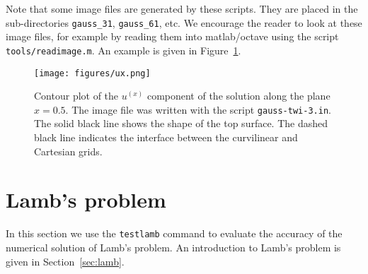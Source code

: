 \documentclass[11pt]{report}
\begin{document}
Note that some image files are generated by these scripts. They are placed in the sub-directories
\verb+gauss_31+, \verb+gauss_61+, etc. We encourage the reader to look at these image files, for
example by reading them into matlab/octave using the script \verb+tools/readimage.m+. An example is
given in Figure~\ref{fig:ux}.
\begin{figure}
\begin{center}
\texttt{[image: figures/ux.png]}
\caption{Contour plot of the $u^{(x)}$ component of the solution along the plane $x=0.5$. The image
  file was written with the script {\tt gauss-twi-3.in}. The solid black line shows the shape of the
  top surface. The dashed black line indicates the interface between the curvilinear and Cartesian
  grids.}
\label{fig:ux}
\end{center}
\end{figure}


\section{Lamb's problem}\label{sec:testlamb}

In this section we use the {\tt testlamb} command to evaluate the accuracy of the numerical
solution of Lamb's problem. An introduction to Lamb's problem is given in Section~\ref{sec:lamb}.
\end{document}
